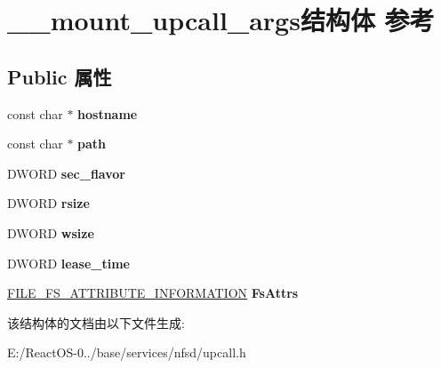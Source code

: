 \hypertarget{struct____mount__upcall__args}{}\section{\+\_\+\+\_\+mount\+\_\+upcall\+\_\+args结构体 参考}
\label{struct____mount__upcall__args}
\subsection*{Public 属性}
\begin{DoxyCompactItemize}
\item 
\mbox{\label{struct____mount__upcall__args_afe78b77eca48efb317e98872b7ef5315}} 
const char $\ast$ {\bfseries hostname}
\item 
\mbox{\label{struct____mount__upcall__args_abb1e0ae868919ca0a6efc3d49949f4c3}} 
const char $\ast$ {\bfseries path}
\item 
\mbox{\label{struct____mount__upcall__args_aad7a0baaefcd775b639e9cf5eff3a67b}} 
D\+W\+O\+RD {\bfseries sec\+\_\+flavor}
\item 
\mbox{\label{struct____mount__upcall__args_a100da123aca3e9d4fca3f3ef44499b95}} 
D\+W\+O\+RD {\bfseries rsize}
\item 
\mbox{\label{struct____mount__upcall__args_ad496a719ff5d222e96a29df9ebae5db3}} 
D\+W\+O\+RD {\bfseries wsize}
\item 
\mbox{\label{struct____mount__upcall__args_ac77f3551094f29b40e9d4b1e920e0980}} 
D\+W\+O\+RD {\bfseries lease\+\_\+time}
\item 
\mbox{\label{struct____mount__upcall__args_a4f6de5ec807a664c28eb759789c89589}} 
\hyperlink{struct___f_i_l_e___f_s___a_t_t_r_i_b_u_t_e___i_n_f_o_r_m_a_t_i_o_n}{F\+I\+L\+E\+\_\+\+F\+S\+\_\+\+A\+T\+T\+R\+I\+B\+U\+T\+E\+\_\+\+I\+N\+F\+O\+R\+M\+A\+T\+I\+ON} {\bfseries Fs\+Attrs}
\end{DoxyCompactItemize}


该结构体的文档由以下文件生成\+:\begin{DoxyCompactItemize}
\item 
E\+:/\+React\+O\+S-\/0../base/services/nfsd/upcall.\+h\end{DoxyCompactItemize}
